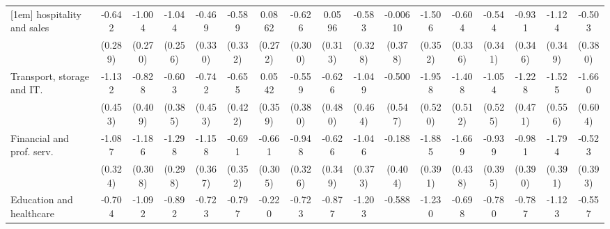 {\begin{tabular}{l*{16}{c}}
[1em]
hospitality and sales&      -0.642\sym{*}  &      -1.004\sym{***}&      -1.044\sym{***}&      -0.469         &      -0.589         &      0.0862         &      -0.626\sym{*}  &      0.0596         &      -0.583         &    -0.00610         &      -1.506\sym{***}&      -0.604         &      -0.544         &      -0.931\sym{**} &      -1.124\sym{**} &      -0.503         \\
                    &     (0.289)         &     (0.270)         &     (0.256)         &     (0.330)         &     (0.332)         &     (0.272)         &     (0.300)         &     (0.313)         &     (0.328)         &     (0.378)         &     (0.352)         &     (0.336)         &     (0.341)         &     (0.346)         &     (0.349)         &     (0.380)         \\
[1em]
Transport, storage and IT.&      -1.132\sym{*}  &      -0.828\sym{*}  &      -0.603         &      -0.742         &      -0.655         &      0.0542         &      -0.559         &      -0.626         &      -1.049\sym{*}  &      -0.500         &      -1.958\sym{***}&      -1.408\sym{**} &      -1.054\sym{*}  &      -1.228\sym{**} &      -1.525\sym{**} &      -1.660\sym{**} \\
                    &     (0.453)         &     (0.409)         &     (0.385)         &     (0.453)         &     (0.422)         &     (0.359)         &     (0.380)         &     (0.480)         &     (0.464)         &     (0.547)         &     (0.520)         &     (0.512)         &     (0.525)         &     (0.471)         &     (0.556)         &     (0.604)         \\
[1em]
Financial and prof. serv.&      -1.087\sym{***}&      -1.186\sym{***}&      -1.298\sym{***}&      -1.158\sym{**} &      -0.691\sym{*}  &      -0.661\sym{*}  &      -0.948\sym{**} &      -0.626         &      -1.046\sym{**} &      -0.188         &      -1.885\sym{***}&      -1.669\sym{***}&      -0.939\sym{*}  &      -0.981\sym{*}  &      -1.794\sym{***}&      -0.523         \\
                    &     (0.324)         &     (0.308)         &     (0.298)         &     (0.367)         &     (0.352)         &     (0.305)         &     (0.326)         &     (0.349)         &     (0.373)         &     (0.404)         &     (0.391)         &     (0.438)         &     (0.395)         &     (0.390)         &     (0.391)         &     (0.393)         \\
[1em]
Education and healthcare&      -0.704\sym{*}  &      -1.092\sym{***}&      -0.892\sym{**} &      -0.723\sym{*}  &      -0.797\sym{*}  &      -0.220         &      -0.723\sym{*}  &      -0.877\sym{*}  &      -1.203\sym{***}&      -0.588         &      -1.230\sym{***}&      -0.698         &      -0.780\sym{*}  &      -0.787\sym{*}  &      -1.123\sym{**} &      -0.557         \\

\end{tabular}}
